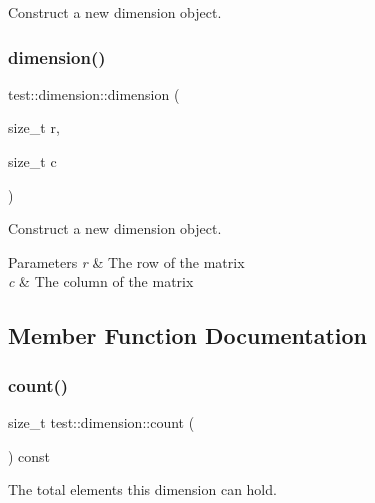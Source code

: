 Construct a new dimension object. 

\mbox{\label{structtest_1_1dimension_adb61bc8272063b8140952029b0559848}} 
\subsubsection{\texorpdfstring{dimension()}{dimension()}\hspace{0.1cm}{\footnotesize\ttfamily [2/2]}}
{\footnotesize\ttfamily test\+::dimension\+::dimension (\begin{DoxyParamCaption}\item[{size\+\_\+t}]{r,  }\item[{size\+\_\+t}]{c }\end{DoxyParamCaption})\hspace{0.3cm}{\ttfamily [inline]}}



Construct a new dimension object. 


\begin{DoxyParams}{Parameters}
{\em r} & The row of the matrix \\
\hline
{\em c} & The column of the matrix \\
\hline
\end{DoxyParams}


\subsection{Member Function Documentation}
\mbox{\label{structtest_1_1dimension_ad114dbd81f74e845282946305ec96b2a}} 
\subsubsection{\texorpdfstring{count()}{count()}}
{\footnotesize\ttfamily size\+\_\+t test\+::dimension\+::count (\begin{DoxyParamCaption}{ }\end{DoxyParamCaption}) const\hspace{0.3cm}{\ttfamily [inline]}}



The total elements this dimension can hold. 

